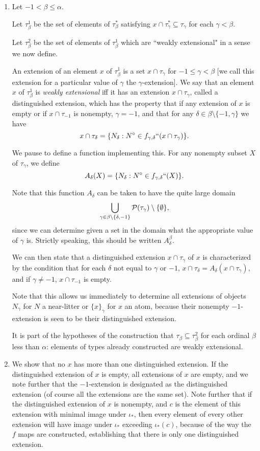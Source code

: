 \documentclass[12pt]{article}
\begin{document}
\begin{enumerate}
\item Let $-1<\beta\leq \alpha$.


Let $\tau_\beta^1$ be the set of elements of $\tau_\beta^*$ satisfying $x \cap \tau^*_\gamma \subseteq \tau_\gamma$ for each $\gamma<\beta$.

Let $\tau_\beta^2$ be the set of elements of $\tau_\beta^1$ which are ``weakly extensional" in a sense we now define.

 An extension of an element $x$ of $\tau_\beta^1$ is a set $x \cap \tau_\gamma$ for $-1 \leq \gamma <\beta$ [we call this extension for a particular value of $\gamma$ the $\gamma$-extension].  We say that an element $x$ of  $\tau_\beta^1$ is {\em weakly extensional\/}
iff it has an extension $x \cap \tau_\gamma$, called a distinguished extension, which has the property that if any extension of $x$ is empty or if $x \cap \tau_{-1}$ is nonempty, $\gamma = -1$, and that for any $\delta \in \beta \setminus \{-1,\gamma\}$ we have $$x \cap \tau_\delta = \{N_\delta:N^\circ \in f_{\gamma,\delta}``(x \cap \tau_\gamma)\}.$$

We pause to define a function implementing this.  For any nonempty subset $X$ of $\tau_\gamma$, we define $$A_\delta(X) =  \{N_\delta:N^\circ \in f_{\gamma,\delta}``(X)\}.$$

Note that this function $A_\delta$ can be taken to have the quite large domain $$\bigcup_{\gamma \in \beta \setminus \{\delta,-1\}} {\cal P}(\tau_\gamma) \setminus \{\emptyset\},$$ since we can determine given a set in the domain what the appropriate value of $\gamma$ is.
Strictly speaking, this should be written $A^{\beta}_{\delta}$.

We can then state that a distinguished extension $x \cap \tau_\gamma$ of $x$ is characterized by the condition that for each $\delta$ not equal to $\gamma$ or $-1$,
$x \cap \tau_\delta = A_\delta(x \cap \tau_\gamma)$, and if $\gamma \neq -1$, $x \cap \tau_{-1}$ is empty.

Note that this allows us immediately to determine all extensions of objects $N_\gamma$ for $N$ a near-litter or $\{x\}_\gamma$ for $x$ an atom, because their nonempty $-1$-extension is seen to be their distinguished extension.

It is part of the hypotheses of the construction that $\tau_\beta \subseteq \tau^2_\beta$ for each ordinal $\beta$ less than $\alpha$:  elements of types already constructed are weakly extensional.

\item We show that no $x$ has more than one distinguished extension.  If the distinguished extension of $x$ is empty, all extensions of $x$ are empty, and we note further that 
the $-1$-extension is designated as the distinguished extension (of course all the extensions are the same set).  Note further that if the distinguished extension of $x$ is nonempty,
and $c$ is the element of this extension with minimal image under $\iota_*$, then every element of every other extension will have image under $\iota_*$ exceeding $\iota_*(c)$, because of the way the $f$ maps are constructed,  establishing that there is only one distinguished extension.


\end{enumerate}
\end{document}
